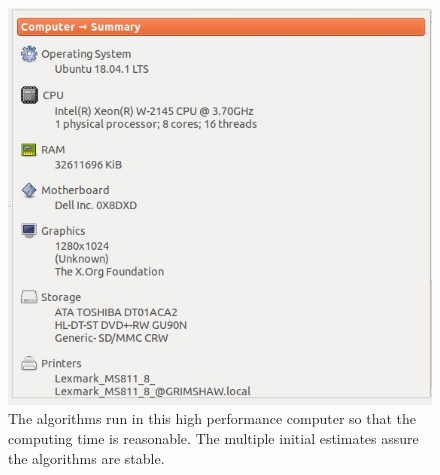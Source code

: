  \begin{figure}\label{hpc}
  \centering
  \includegraphics[scale=.5]{hpc}
  \caption{The algorithms run in this high performance computer so that the computing time is reasonable.  The multiple initial estimates assure the algorithms are stable.}
\end{figure}



